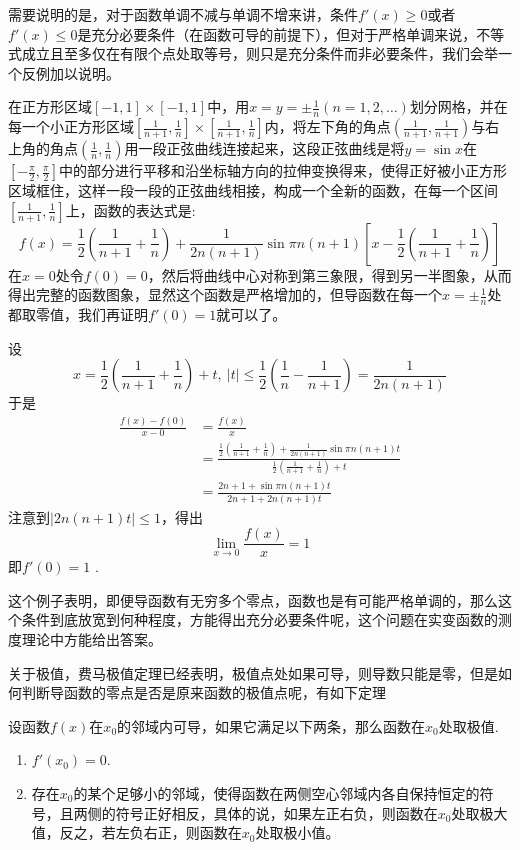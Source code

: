 \begin{example}
需要说明的是，对于函数单调不减与单调不增来讲，条件$f'(x) \geqslant 0$或者$f'(x) \leqslant 0$是充分必要条件（在函数可导的前提下），但对于严格单调来说，不等式成立且至多仅在有限个点处取等号，则只是充分条件而非必要条件，我们会举一个反例加以说明。

在正方形区域$[-1,1]\times[-1,1]$中，用$x=y=\pm \frac{1}{n}(n=1,2,\ldots)$划分网格，并在每一个小正方形区域$[\frac{1}{n+1},\frac{1}{n}] \times [\frac{1}{n+1},\frac{1}{n}]$内，将左下角的角点$\left(\frac{1}{n+1},\frac{1}{n+1}\right)$与右上角的角点$\left(\frac{1}{n},\frac{1}{n}\right)$用一段正弦曲线连接起来，这段正弦曲线是将$y=\sin{x}$在$\left[ -\frac{\pi}{2}, \frac{\pi}{2} \right]$中的部分进行平移和沿坐标轴方向的拉伸变换得来，使得正好被小正方形区域框住，这样一段一段的正弦曲线相接，构成一个全新的函数，在每一个区间$[\frac{1}{n+1},\frac{1}{n}]$上，函数的表达式是:
\[ f(x) = \frac{1}{2} \left( \frac{1}{n+1} + \frac{1}{n} \right) + \frac{1}{2n(n+1)} \sin{\pi n(n+1) \left[ x - \frac{1}{2} \left( \frac{1}{n+1} + \frac{1}{n} \right) \right]} \]
在$x=0$处令$f(0)=0$，然后将曲线中心对称到第三象限，得到另一半图象，从而得出完整的函数图象，显然这个函数是严格增加的，但导函数在每一个$x = \pm \frac{1}{n}$处都取零值，我们再证明$f'(0)=1$就可以了。

设
\[ x = \frac{1}{2} \left( \frac{1}{n+1} + \frac{1}{n} \right) +t, \  |t| \leqslant \frac{1}{2}\left( \frac{1}{n} - \frac{1}{n+1} \right) = \frac{1}{2n(n+1)} \]
于是
\begin{align*}
  \frac{f(x)-f(0)}{x-0} & = \frac{f(x)}{x} \\
                        & = \frac{\frac{1}{2} \left( \frac{1}{n+1} + \frac{1}{n} \right)+\frac{1}{2n(n+1)}\sin{\pi n(n+1)t}}{\frac{1}{2} \left( \frac{1}{n+1} + \frac{1}{n} \right)+t} \\
  & = \frac{2n+1+\sin{\pi n(n+1)t}}{2n+1+2n(n+1)t}
\end{align*}
注意到$|2n(n+1)t| \leqslant 1$，得出
\[ \lim_{x \to 0} \frac{f(x)}{x} = 1 \]
即$f'(0)=1$ .

这个例子表明，即便导函数有无穷多个零点，函数也是有可能严格单调的，那么这个条件到底放宽到何种程度，方能得出充分必要条件呢，这个问题在实变函数的测度理论中方能给出答案。
\end{example}


关于极值，费马极值定理已经表明，极值点处如果可导，则导数只能是零，但是如何判断导函数的零点是否是原来函数的极值点呢，有如下定理
\begin{theorem}
  设函数$f(x)$在$x_0$的邻域内可导，如果它满足以下两条，那么函数在$x_0$处取极值.
  \begin{enumerate}
  \item $f'(x_0)=0$.
  \item 存在$x_0$的某个足够小的邻域，使得函数在两侧空心邻域内各自保持恒定的符号，且两侧的符号正好相反，具体的说，如果左正右负，则函数在$x_0$处取极大值，反之，若左负右正，则函数在$x_0$处取极小值。
  \end{enumerate}
\end{theorem}

